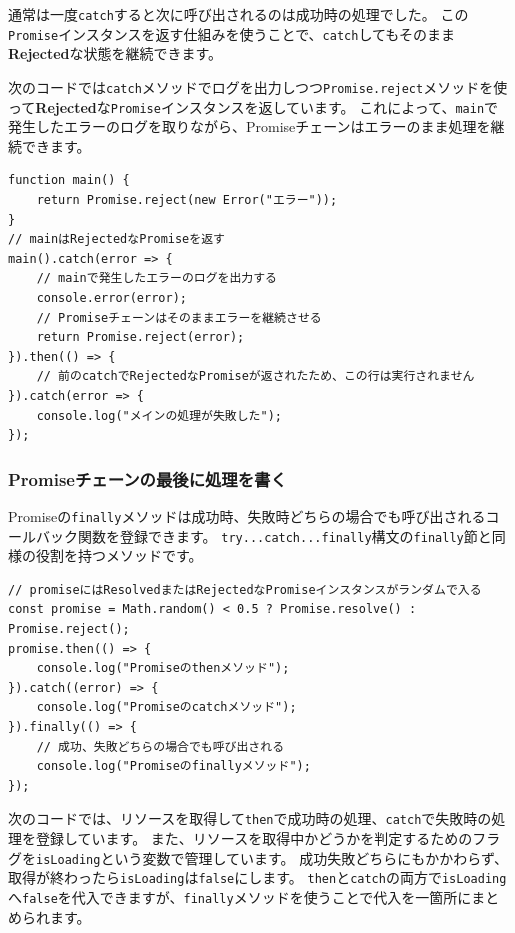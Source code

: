 通常は一度\texttt{catch}すると次に呼び出されるのは成功時の処理でした。
この\texttt{Promise}インスタンスを返す仕組みを使うことで、\texttt{catch}してもそのまま\textbf{Rejected}な状態を継続できます。

次のコードでは\texttt{catch}メソッドでログを出力しつつ\texttt{Promise.reject}メソッドを使って\textbf{Rejected}な\texttt{Promise}インスタンスを返しています。
これによって、\texttt{main}で発生したエラーのログを取りながら、Promiseチェーンはエラーのまま処理を継続できます。

\begin{lstlisting}
function main() {
    return Promise.reject(new Error("エラー"));
}
// mainはRejectedなPromiseを返す
main().catch(error => {
    // mainで発生したエラーのログを出力する
    console.error(error);
    // Promiseチェーンはそのままエラーを継続させる
    return Promise.reject(error);
}).then(() => {
    // 前のcatchでRejectedなPromiseが返されたため、この行は実行されません
}).catch(error => {
    console.log("メインの処理が失敗した");
});
\end{lstlisting}

\hypertarget{promise-finally}{%
\subsubsection{Promiseチェーンの最後に処理を書く\,\protect{}}\label{promise-finally}}

Promiseの\texttt{finally}メソッドは成功時、失敗時どちらの場合でも呼び出されるコールバック関数を登録できます。
\texttt{try...catch...finally}構文の\texttt{finally}節と同様の役割を持つメソッドです。

\begin{lstlisting}
// promiseにはResolvedまたはRejectedなPromiseインスタンスがランダムで入る
const promise = Math.random() < 0.5 ? Promise.resolve() : Promise.reject();
promise.then(() => {
    console.log("Promiseのthenメソッド");
}).catch((error) => {
    console.log("Promiseのcatchメソッド");
}).finally(() => {
    // 成功、失敗どちらの場合でも呼び出される
    console.log("Promiseのfinallyメソッド");
});
\end{lstlisting}

次のコードでは、リソースを取得して\texttt{then}で成功時の処理、\texttt{catch}で失敗時の処理を登録しています。
また、リソースを取得中かどうかを判定するためのフラグを\texttt{isLoading}という変数で管理しています。
成功失敗どちらにもかかわらず、取得が終わったら\texttt{isLoading}は\texttt{false}にします。
\texttt{then}と\texttt{catch}の両方で\texttt{isLoading}へ\texttt{false}を代入できますが、\texttt{finally}メソッドを使うことで代入を一箇所にまとめられます。

